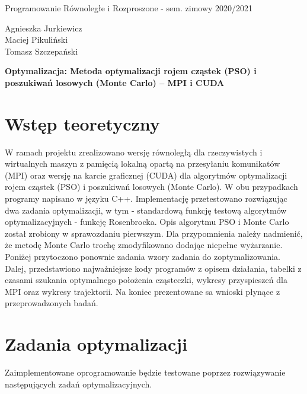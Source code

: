 \documentclass[11pt, a4paper, oneside]{article}
\begin{document}
\hspace*{-\parindent}%
\begin{minipage}{\textwidth}
  \begin{minipage}{.7\textwidth}
   \begin{flushleft}
	Programowanie Równoległe i Rozproszone - sem. zimowy 2020/2021
	\end{flushleft}
  \end{minipage}
  \begin{minipage}{.3\textwidth}
    \begin{flushright}
	Agnieszka Jurkiewicz \\
	Maciej Pikuliński \\
	Tomasz Szczepański
	\end{flushright}
  \end{minipage}%
\end{minipage}
\begin{center}
{\Large \textbf{Optymalizacja: Metoda optymalizacji rojem cząstek (PSO) i poszukiwań losowych (Monte Carlo) -- MPI i CUDA}}
\end{center}


\section{Wstęp teoretyczny}
 
W ramach projektu zrealizowano wersję równoległą dla rzeczywistych i wirtualnych maszyn z pamięcią lokalną opartą na przesyłaniu komunikatów (MPI) oraz wersję na karcie graficznej (CUDA) dla algorytmów optymalizacji rojem cząstek (PSO) i poszukiwań losowych (Monte Carlo). W obu przypadkach programy napisano w języku C++. Implementację przetestowano rozwiązując dwa zadania optymalizacji, w tym - standardową funkcję testową algorytmów optymalizacyjnych - funkcję Rosenbrocka. Opis algorytmu PSO i Monte Carlo został zrobiony w sprawozdaniu pierwszym. Dla przypomnienia należy nadmienić, że metodę Monte Carlo trochę zmodyfikowano dodając niepełne wyżarzanie. Poniżej przytoczono ponownie zadania wzory zadania do zoptymalizowania. Dalej, przedstawiono najważniejsze kody programów z opisem działania, tabelki z czasami szukania optymalnego położenia cząsteczki, wykresy przyspieszeń dla MPI oraz wykresy trajektorii. Na koniec prezentowane sa wnioski płynące z przeprowadzonych badań.


\section{Zadania optymalizacji}
Zaimplementowane oprogramowanie będzie testowane poprzez rozwiązywanie następujących zadań optymalizacyjnych.
\end{document}
